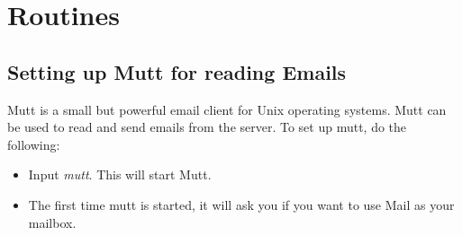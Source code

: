 
\section{Routines}

\subsection{Setting up Mutt for reading Emails}
Mutt \cite{mutt} is a small but powerful email client for Unix operating systems. Mutt can be used to read and send emails from the server. To set up mutt, do the following:
\begin{itemize}
\item Input \emph{mutt}. This will start Mutt.
\item The first time mutt is started, it will ask you if you want to use Mail as your mailbox.

\end{itemize} 
